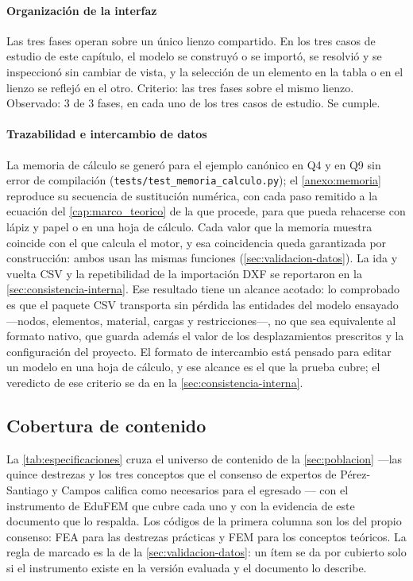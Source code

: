 \paragraph{Organización de la interfaz} Las tres fases operan sobre un único lienzo compartido. En los tres casos de estudio de este capítulo, el modelo se construyó o se importó, se resolvió y se inspeccionó sin cambiar de vista, y la selección de un elemento en la tabla o en el lienzo se reflejó en el otro. Criterio: las tres fases sobre el mismo lienzo. Observado: 3 de 3 fases, en cada uno de los tres casos de estudio. Se cumple.

\paragraph{Trazabilidad e intercambio de datos} La memoria de cálculo se generó para el ejemplo canónico en Q4 y en Q9 sin error de compilación (\mbox{\texttt{tests/test\_memoria\_calculo.py}}); el \autoref{anexo:memoria} reproduce su secuencia de sustitución numérica, con cada paso remitido a la ecuación del \autoref{cap:marco_teorico} de la que procede, para que pueda rehacerse con lápiz y papel o en una hoja de cálculo. Cada valor que la memoria muestra coincide con el que calcula el motor, y esa coincidencia queda garantizada por construcción: ambos usan las mismas funciones (\autoref{sec:validacion-datos}). La ida y vuelta CSV y la repetibilidad de la importación DXF se reportaron en la \autoref{sec:consistencia-interna}. Ese resultado tiene un alcance acotado: lo comprobado es que el paquete CSV transporta sin pérdida las entidades del modelo ensayado —nodos, elementos, material, cargas y restricciones—, no que sea equivalente al formato nativo, que guarda además el valor de los desplazamientos prescritos y la configuración del proyecto. El formato de intercambio está pensado para editar un modelo en una hoja de cálculo, y ese alcance es el que la prueba cubre; el veredicto de ese criterio se da en la \autoref{sec:consistencia-interna}.

\subsection{Cobertura de contenido}
\label{sec:contenido-didactico}

La \autoref{tab:especificaciones} cruza el universo de contenido de la \autoref{sec:poblacion} —las quince destrezas y los tres conceptos que el consenso de expertos de Pérez-Santiago y Campos califica como necesarios para el egresado \autocite[pp.~1162-1163]{perezsantiago2023fem}— con el instrumento de EduFEM que cubre cada uno y con la evidencia de este documento que lo respalda. Los códigos de la primera columna son los del propio consenso: FEA para las destrezas prácticas y FEM para los conceptos teóricos. La regla de marcado es la de la \autoref{sec:validacion-datos}: un ítem se da por cubierto solo si el instrumento existe en la versión evaluada y el documento lo describe.

